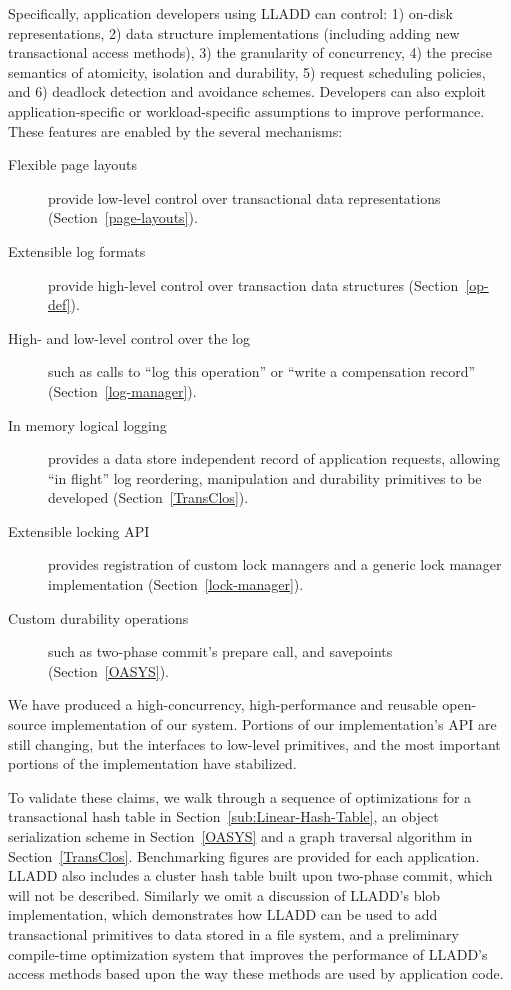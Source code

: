 \documentclass[10pt,letterpaper,twocolumn,english]{article}
\newcommand{\yad}{LLADD\xspace}
\begin{document}
Specifically, application developers using \yad can control: 1)
on-disk representations, 2) data structure implementations (including
adding new transactional access methods), 3) the granularity of
concurrency, 4) the precise semantics of atomicity, isolation and
durability, 5) request scheduling policies, and 6) deadlock detection and avoidance schemes.  Developers
can also exploit application-specific or workload-specific assumptions
to improve performance.
These features are enabled by the several mechanisms:
\begin{description}
\item[Flexible page layouts] provide low-level control over 
      transactional data representations (Section~\ref{page-layouts}).
\item[Extensible log formats] provide high-level control over
      transaction data structures (Section~\ref{op-def}).
\item [High- and low-level control over the log] such as calls to ``log this
      operation'' or ``write a compensation record'' (Section~\ref{log-manager}).
\item [In memory logical logging] provides a data store independent
      record of application requests, allowing ``in flight'' log
      reordering, manipulation and durability primitives to be
      developed (Section~\ref{TransClos}).
\item[Extensible locking API] provides registration of custom lock managers
      and a generic lock manager implementation (Section~\ref{lock-manager}).
\item[Custom durability operations] such as two-phase commit's
      prepare call, and savepoints (Section~\ref{OASYS}).
\end{description}

We have produced a high-concurrency, high-performance and reusable
open-source implementation of our system.  Portions of our
implementation's API are still changing, but the interfaces 
to low-level primitives, and the most important portions of the implementation have stabilized.  

To validate these claims, we walk
through a sequence of optimizations for a transactional hash
table in Section~\ref{sub:Linear-Hash-Table}, an object serialization 
scheme in Section~\ref{OASYS} and a graph traversal algorithm in
Section~\ref{TransClos}.  Benchmarking figures are provided for each
application.  \yad also includes a cluster hash table 
built upon two-phase commit, which will not be described.  Similarly we omit a discussion of \yad's 
blob implementation, which demonstrates how \yad can
be used to add transactional primitives to data stored 
in a file system, and a preliminary compile-time 
optimization system that improves the performance 
of \yad's access methods based upon the way these methods 
are used by application code.
\end{document}
